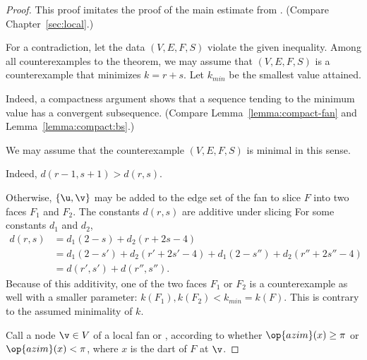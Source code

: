 \begin{proof} This proof imitates the proof of the main estimate from
  \cite{Hales:2006:DCG}.   (Compare
  Chapter~\ref{sec:local}.)

  For a contradiction, let the data $(V,E,F,S)$ violate the given
  inequality.  Among all counterexamples to the theorem, we may assume
  that $(V,E,F,S)$ is a counterexample that minimizes $k=r+s$.  Let
  $k_{min}$ be the smallest value attained.



    Indeed, a compactness argument shows that a sequence
tending to the minimum value has a convergent subsequence.  (Compare
Lemma~\ref{lemma:compact-fan} and Lemma~\ref{lemma:compact:bs}.)

We may assume that the counterexample $(V,E,F,S)$ is minimal
in this sense.

  Indeed, $d(r-1,s+1)>d(r,s)$.

  Otherwise, $\{\u,\v\}$ may be added to the edge
set of the fan to slice $F$ into two faces $F_1$ and $F_2$.
The constants $d(r,s)$ are additive under slicing
For some constants $d_1$
and $d_2$,
\begin{align}\label{eqn:drs}
d(r,s) &= d_1 (2 - s) + d_2 (r + 2 s-4) \nonumber\\
&= d_1 (2-s') + d_2 (r'+2 s'-4) + d_1 (2-s'') + d_2 (r''+2s''-4)\nonumber\\
&= d(r',s') + d(r'',s'').
\end{align}
Because of this additivity, one of the two faces $F_1$ or $F_2$ is a
counterexample as well with a smaller parameter:
$k(F_1),k(F_2)<k_{min}=k(F)$.  This is contrary to the assumed
minimality of $k$.



Call a node $\v\in V$ of a local fan  
or , according
to whether $\op{azim}(x)\ge\pi$ or $\op{azim}(x)<\pi$, where $x$ is
the dart of $F$ at $\v$. 



\end{proof}
